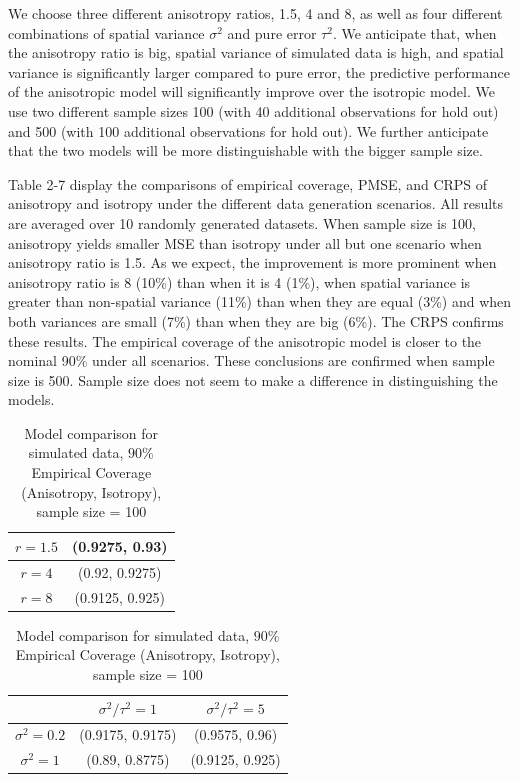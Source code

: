 \documentclass[12pt,twoside]{dukestatscithesis}
\theoremstyle{definition}
\theoremstyle{definition}
\theoremstyle{definition}
\theoremstyle{remark}
\begin{document}
We choose three different anisotropy ratios, 1.5, 4 and 8, as well as
four different combinations of spatial variance \(\sigma^2\) and pure
error \(\tau^2\). We anticipate that, when the anisotropy ratio is big,
spatial variance of simulated data is high, and spatial variance is
significantly larger compared to pure error, the predictive performance
of the anisotropic model will significantly improve over the isotropic
model. We use two different sample sizes 100 (with 40 additional
observations for hold out) and 500 (with 100 additional observations for
hold out). We further anticipate that the two models will be more
distinguishable with the bigger sample size.

Table 2-7 display the comparisons of empirical coverage, PMSE, and CRPS
of anisotropy and isotropy under the different data generation
scenarios. All results are averaged over 10 randomly generated datasets.
When sample size is 100, anisotropy yields smaller MSE than isotropy
under all but one scenario when anisotropy ratio is 1.5. As we expect,
the improvement is more prominent when anisotropy ratio is 8 (10\%) than
when it is 4 (1\%), when spatial variance is greater than non-spatial
variance (11\%) than when they are equal (3\%) and when both variances
are small (7\%) than when they are big (6\%). The CRPS confirms these
results. The empirical coverage of the anisotropic model is closer to
the nominal 90\% under all scenarios. These conclusions are confirmed
when sample size is 500. Sample size does not seem to make a difference
in distinguishing the models.
\begin{table}[H]
\centering
\setlength{\extrarowheight}{10pt}
\hspace*{-1.5cm}
\begin{tabular}{|c|c|}
\hline
$r = 1.5$ & (0.9275, 0.93) \\[5pt]
\hline
$r = 4$ & (0.92, 0.9275) \\[5pt]
\hline
$r = 8$ & (0.9125, 0.925) \\[5pt]
\hline
\end{tabular}
\quad
\begin{tabular}{|c|c|c|}
\hline
 & $\sigma^2/\tau^2 = 1 $ & $\sigma^2/\tau^2 = 5$\\[5pt]
\hline
$\sigma^2 = 0.2$ & (0.9175, 0.9175) & (0.9575, 0.96)\\[5pt]
\hline
$\sigma^2 = 1$ & (0.89, 0.8775) & (0.9125, 0.925)\\[5pt]
\hline
\end{tabular}
\hspace*{-1.5cm}
\caption{Model comparison for simulated data, $90\%$ Empirical Coverage (Anisotropy, Isotropy), sample size = 100}
\end{table}
\end{document}
